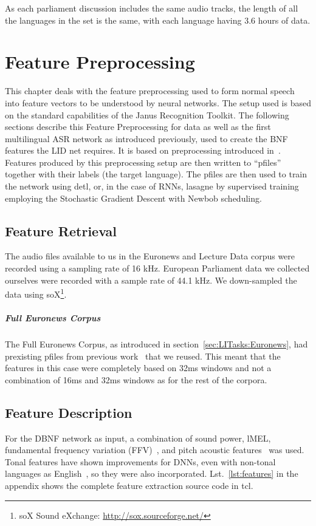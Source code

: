 As each parliament discussion includes the same audio tracks, the length of all the languages in the set is the same, with each language having 3.6 hours of data. 

\chapter{Feature Preprocessing}
\label{ch:FP}

This chapter deals with the feature preprocessing used to form normal speech into feature vectors to be understood by neural networks. The setup used is based on the standard capabilities of the Janus Recognition Toolkit. The following sections describe this Feature Preprocessing for data as well as the first multilingual ASR network as introduced previously, used to create the BNF features the LID net requires.  It is based on preprocessing introduced in~\cite{Mueller2016b}.
Features produced by this preprocessing setup are then written to ``pfiles'' together with their labels (the target language). The pfiles are then used to train the network using detl, or, in the case of RNNs, lasagne by supervised training employing the Stochastic Gradient Descent with Newbob scheduling.

\section{Feature Retrieval}
\label{sec:FP:FA}
The audio files available to us in the Euronews and Lecture Data corpus were recorded using a sampling rate of 16 kHz. European Parliament data we collected ourselves were recorded with a sample rate of 44.1 kHz. We down-sampled the data using soX\footnote{soX Sound eXchange: \url{http://sox.sourceforge.net/}}. 
\paragraph{Full Euronews Corpus} The Full Euronews Corpus, as introduced in section~\ref{sec:LITasks:Euronews}, had prexisting pfiles from previous work~\cite{Mueller2016b} that we reused. This meant that the features in this case were completely based on 32ms windows and not a combination of 16ms and 32ms windows as for the rest of the corpora.

\section{Feature Description}
\label{sec:FP:FD}
For the DBNF network as input, a combination of sound power, lMEL, fundamental frequency variation (FFV)~\cite{laskowski2008fundamental}, \cite{laskowski2008fundamental} and pitch acoustic features~\cite{schubert1999grundfrequenzverfolgung} was used. Tonal features have shown improvements for DNNs, even with non-tonal languages as English~\cite{metze2013models}, so they were also incorporated. Lst.~\ref{lst:features} in the appendix shows the complete feature extraction source code in tcl.


